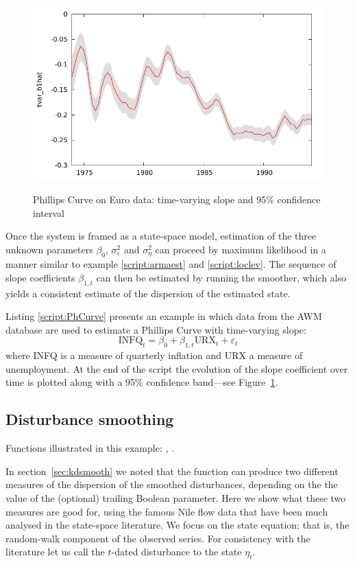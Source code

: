\begin{figure}[htbp]
  \centering
    \includegraphics{figures/timevar_PhCurve} \\[10pt]
  \caption{Phillips Curve on Euro data: time-varying slope and
    95\% confidence interval}
  \label{fig:tvar}
\end{figure}

Once the system is framed as a state-space model, estimation of the
three unknown parameters $\beta_0$, $\sigma^2_{\varepsilon}$ and
$\sigma^2_{\eta}$ can proceed by maximum likelihood in a manner
similar to example \ref{script:armaest} and \ref{script:loclev}. The
sequence of slope coefficients $\beta_{1,t}$ can then be estimated by
running the smoother, which also yields a consistent estimate of the
dispersion of the estimated state.

Listing \ref{script:PhCurve} presents an example in which data from
the AWM database are used to estimate a Phillips Curve with
time-varying slope:
\[
\mbox{INFQ}_t = \beta_0 + \beta_{1,t} \mbox{URX}_t + \varepsilon_t
\]
where INFQ is a measure of quarterly inflation and URX a measure of
unemployment.  At the end of the script the evolution of the slope
coefficient over time is plotted along with a 95\% confidence
band---see Figure~\ref{fig:tvar}.


\subsection{Disturbance smoothing}
\label{sec:example_dsmooth}

Functions illustrated in this example: , .

In section~\ref{sec:kdsmooth} we noted that the 
function can produce two different measures of the dispersion of the
smoothed disturbances, depending on the the value of the (optional)
trailing Boolean parameter. Here we show what these two measures are
good for, using the famous Nile flow data that have been much analysed
in the state-space literature. We focus on the state equation; that
is, the random-walk component of the observed series.  For consistency
with the literature let us call the $t$-dated disturbance to the state
$\eta_t$.

